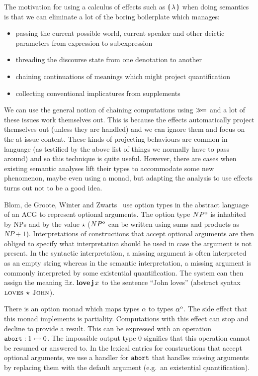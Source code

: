 The motivation for using a calculus of effects such as $\llparenthesis \, \lambda \, \rrparenthesis$
when doing semantics is that we can eliminate a lot of the boring
boilerplate which manages:

\begin{itemize}
\item passing the current possible world, current speaker and other deictic
  parameters from expression to subexpression
\item threading the discourse state from one denotation to another
\item chaining continuations of meanings which might project quantification
\item collecting conventional implicatures from supplements
\end{itemize}

We can use the general notion of chaining computations using $\mathbin{\gg\!=}$ and
a lot of these issues work themselves out. This is because the effects
automatically project themselves out (unless they are handled) and we can
ignore them and focus on the at-issue content. These kinds of projecting
behaviours are common in language (as testified by the above list of things
we normally have to pass around) and so this technique is quite
useful. However, there are cases when existing semantic analyses lift their
types to accommodate some new phenomenon, maybe even using a monad, but
adapting the analysis to use effects turns out not to be a good idea.

Blom, de Groote, Winter and Zwarts~\cite{blom2012implicit} use option types
in the abstract language of an ACG to represent optional arguments. The
option type $NP^{\mathrm{o}}$ is inhabited by NPs and by the value $\star$
($NP^{\mathrm{o}}$ can be written using sums and products as $NP +
1$). Interpretations of constructions that accept optional arguments are
then obliged to specify what interpretation should be used in case the
argument is not present. In the syntactic interpretation, a missing
argument is often interpreted as an empty string whereas in the semantic
interpretation, a missing argument is commonly interpreted by some
existential quantification. The system can then assign the meaning
$\exists x.\ \textbf{love}\,\textbf{j}\,x$ to the sentence ``John loves''
(abstract syntax $\textsc{loves}\,\star\,\textsc{John}$).

There is an option monad which maps types $\alpha$ to types
$\alpha^{\mathrm{o}}$. The side effect that this monad implements is
partiality. Computations with this effect can stop and decline to provide a
result. This can be expressed with an operation
$\mathtt{abort} : 1 \rightarrowtail 0$. The impossible output type $0$ signifies that this
operation cannot be resumed or answered to. In the lexical entries for
constructions that accept optional arguments, we use a handler for
$\mathtt{abort}$ that handles missing arguments by replacing them with the
default argument (e.g.\ an existential quantification).

